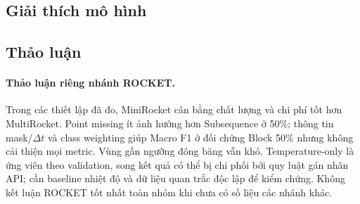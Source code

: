 \subsection{Giải thích mô hình}
\label{sec:giai-thich-mo-hinh-ket-qua}


\subsection{Thảo luận}
\label{sec:thao-luan}


\paragraph{Thảo luận riêng nhánh ROCKET.} Trong các thiết lập đã đo, MiniRocket cân bằng chất lượng và chi phí tốt hơn MultiRocket. Point missing ít ảnh hưởng hơn Subsequence ở 50\%; thông tin mask/$\Delta t$ và class weighting giúp Macro F1 ở đối chứng Block 50\% nhưng không cải thiện mọi metric. Vùng gần ngưỡng đóng băng vẫn khó. Temperature-only là ứng viên theo validation, song kết quả có thể bị chi phối bởi quy luật gán nhãn API; cần baseline nhiệt độ và dữ liệu quan trắc độc lập để kiểm chứng. Không kết luận ROCKET tốt nhất toàn nhóm khi chưa có số liệu các nhánh khác.
